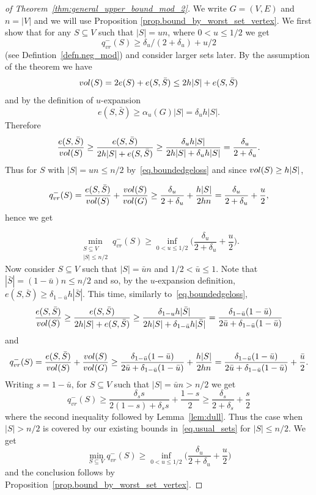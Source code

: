 \documentclass[10pt,a4paper]{amsart}
\newcommand{\vol}{{\rm vol}}
\begin{document}
\begin{proof}[of Theorem~\ref{thm:general_upper_bound_mod_2}]
	We write $G=(V,E)$ and $n=|V|$ and we will use Proposition \ref{prop.bound_by_worst_set_vertex}. We first show that for any $S \subseteq V$ such that $|S| =un$, where $0<u\leq 1/2$ we get
	\[
	q_{vr}^-(S) \geq \delta_u/(2+\delta_u)+u/2
	\]
	(see Defintion~\ref{defn.neg_mod}) and consider larger sets later. By the assumption of the theorem we have
	\[
		\vol(S) = 2e(S) + e(S,\bar{S}) \leq 2 h|S| + e(S,\bar{S})
	\]
	and by the definition of $u$-expansion
	\[
		e(S,\bar{S}) \geq \alpha_u(G)|S| = \delta_u h |S|.
	\]
	Therefore
	\begin{equation}\label{eq.boundedgeloss}
		\frac{e(S, \bar{S})}{\vol(S)} \geq \frac{e(S, \bar{S})}{2 h|S| + e(S,\bar{S})} 
		\geq \frac{\delta_u h|S|}{2h|S|+ \delta_u h|S|} = \frac{\delta_u}{2+\delta_u}.
	\end{equation}
    Thus for $S$ with $|S| =  un \leq n/2$ by~\eqref{eq.boundedgeloss} and since $\vol(S)\geq h|S|$,
    
    \[ q_{vr}^{-}(S) = \frac{e(S, \bar{S})}{\vol(S) } + \frac{\vol(S)}{\vol(G)} \geq \frac{\delta_u}{2+\delta_u} + \frac{h|S|}{2hn} =  \frac{\delta_u}{2+\delta_u} + \frac{u}{2}, \]
    hence we get 
   
    \begin{equation}\label{eq.usual_sets}\min_{\substack{S\subseteq V\\|S|\leq n/2}} q_{vr}^{-}(S)\geq \inf_{0 < u \leq 1/2} \Big( \frac{\delta_u}{2+\delta_u}+\frac{u}{2} \Big).
	\end{equation}
	Now consider $S \subseteq V$ such that $|S| = \bar{u}n$ and $1/2<\bar{u}\leq 1$. Note that $|\bar{S}|=(1-\bar{u})n \leq n/2$ and so, by the $u$-expansion definition, $e(S,\bar{S}) \geq \delta_{1-\bar{u}}h|\bar{S}|$. This time, similarly to~\eqref{eq.boundedgeloss},
	\[
		\frac{e(S, \bar{S})}{\vol(S)} 
		\geq \frac{e(S, \bar{S})}{2 h|S| + e(S,\bar{S})}
		\geq \frac{\delta_{1-u} h|\bar{S}|}{2h|S|+ \delta_{1-\bar{u}} h|\bar{S}|} = \frac{\delta_{1-\bar{u}} (1-\bar{u})}{2\bar{u}+\delta_{1-\bar{u}}(1-\bar{u})}
	\]
	and 
	\[ q_{vr}^{-}(S) = \frac{e(S, \bar{S})}{\vol(S) } + \frac{\vol(S)}{\vol(G)} \geq \frac{\delta_{1-\bar{u}}(1-\bar{u})}{2\bar{u}+\delta_{1-\bar{u}}(1-\bar{u})} + \frac{h|S|}{2hn} =  \frac{\delta_{1-\bar{u}}(1-\bar{u})}{2\bar{u}+\delta_{1-\bar{u}}(1-\bar{u})} + \frac{\bar{u}}{2}. \]
	Writing $s=1-\bar{u}$, for $S \subseteq V$ such that $|S|=\bar{u}n > n/2$ we get
	\[ q_{vr}^{-}(S)  \geq \frac{\delta_{s}s}{2(1-s)+\delta_{s}s} + \frac{1-s}{2} \geq \frac{\delta_s}{2+\delta_s}+ \frac{s}{2} \]
	where the second inequality followed by Lemma~\ref{lem:dull}. Thus the case when $|S| > n/2$ is covered by our existing bounds in~\eqref{eq.usual_sets} for $|S|\leq n/2$. We get
	\[
		\min_{S \subseteq V} q_{vr}^{-}(S)\geq \inf_{0 < u \leq 1/2} \Big( \frac{\delta_u}{2+\delta_u}+\frac{u}{2} \Big)
	\]
	and the conclusion follows by Proposition~\ref{prop.bound_by_worst_set_vertex}.
\end{proof}
\end{document}

